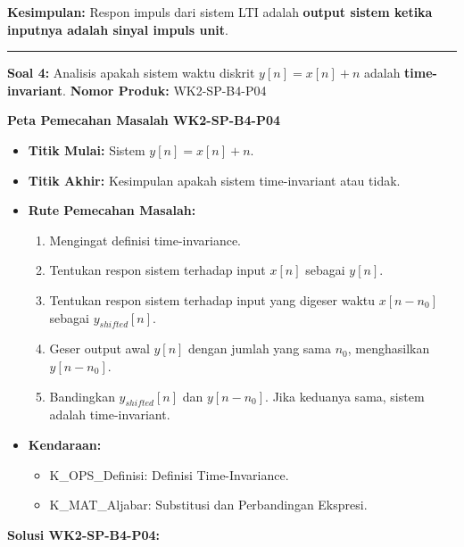 \documentclass[
  letterpaper,
  DIV=11,
  numbers=noendperiod]{scrreprt}
\providecommand{\tightlist}{%
  \setlength{\itemsep}{0pt}\setlength{\parskip}{0pt}}
\begin{document}
\textbf{Kesimpulan:} Respon impuls dari sistem LTI adalah \textbf{output
sistem ketika inputnya adalah sinyal impuls unit}.

\begin{center}\rule{0.5\linewidth}{0.5pt}\end{center}

\textbf{Soal 4:} Analisis apakah sistem waktu diskrit
\(y[n] = x[n] + n\) adalah \textbf{time-invariant}. \textbf{Nomor
Produk:} WK2-SP-B4-P04

\textbf{Peta Pemecahan Masalah WK2-SP-B4-P04}

\begin{itemize}
\tightlist
\item
  \textbf{Titik Mulai:} Sistem \(y[n] = x[n] + n\).
\item
  \textbf{Titik Akhir:} Kesimpulan apakah sistem time-invariant atau
  tidak.
\item
  \textbf{Rute Pemecahan Masalah:}

  \begin{enumerate}
  \def\labelenumi{\arabic{enumi}.}
  \tightlist
  \item
    Mengingat definisi time-invariance.
  \item
    Tentukan respon sistem terhadap input \(x[n]\) sebagai \(y[n]\).
  \item
    Tentukan respon sistem terhadap input yang digeser waktu
    \(x[n-n_0]\) sebagai \(y_{shifted}[n]\).
  \item
    Geser output awal \(y[n]\) dengan jumlah yang sama \(n_0\),
    menghasilkan \(y[n-n_0]\).
  \item
    Bandingkan \(y_{shifted}[n]\) dan \(y[n-n_0]\). Jika keduanya sama,
    sistem adalah time-invariant.
  \end{enumerate}
\item
  \textbf{Kendaraan:}

  \begin{itemize}
  \tightlist
  \item
    K\_OPS\_Definisi: Definisi Time-Invariance.
  \item
    K\_MAT\_Aljabar: Substitusi dan Perbandingan Ekspresi.
  \end{itemize}
\end{itemize}

\textbf{Solusi WK2-SP-B4-P04:}
\end{document}
